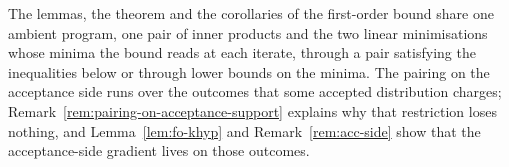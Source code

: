 
The lemmas, the theorem and the corollaries of the first-order bound share
one ambient program, one pair of inner products and the two linear
minimisations whose minima the bound reads at each iterate, through a pair
satisfying the inequalities below or through lower bounds on the minima.
The pairing on the
acceptance side runs over the outcomes that some accepted distribution
charges; Remark~\ref{rem:pairing-on-acceptance-support} explains why that
restriction loses nothing, and Lemma~\ref{lem:fo-khyp} and
Remark~\ref{rem:acc-side} show that the acceptance-side gradient lives
on those outcomes.

